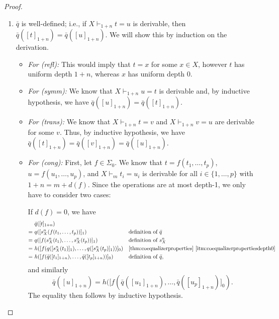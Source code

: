 \documentclass[11pt,a4paper]{amsart}
\newcommand{\sigp}{\Sigma_0}
\newcommand{\supp}{\mathsf{supp}}
\theoremstyle{plain}
\numberwithin{equation}{section}
\newcommand{\+}[1]{\mathcal{#1}\xspace}
\theoremstyle{definition}
\begin{document}
\begin{proof}
\begin{enumerate}[wide]
            Furthermore, it follows by equivariance of \(s^n_X\), the canonical projection, and \(q\), that
            \[
                \supp(\bar{q}([t]_{1 + n})) = \supp(q([s^n_X(t)]_1)) \subseteq \supp(t).
            \]
        \item \label{itm:coequalizerwelldefinedness}
            \(\bar{q}\) is well-defined; i.e., if \(X \vdash_{1 + n} t = u\) is derivable, then \(\bar{q}([t]_{1 + n}) = \bar{q}([u]_{1 + n})\).
            We will show this by induction on the derivation.
            \begin{itemize}
                \item
                    \textit{For (refl):}
                    This would imply that \(t = x\) for some \(x \in X\), however \(t\) has uniform depth \(1 + n\), whereas \(x\) has uniform depth \(0\).
                \item
                    \textit{For (symm):}
                    We know that \(X \vdash_{1 + n} u = t\) is derivable and, by inductive hypothesis, we have \(\bar{q}([u]_{1 + n}) = \bar{q}([t]_{1 + n})\).
                \item
                    \textit{For (trans):}
                    We know that \(X \vdash_{1 + n} t = v\) and \(X \vdash_{1 + n} v = u\) are derivable for some \(v\).
                    Thus, by inductive hypothesis, we have \(\bar{q}([t]_{1 + n}) = \bar{q}([v]_{1 + n}) = \bar{q}([u]_{1 + n})\).
                \item
                    \textit{For (cong):} First, let $f\in\sigp$.
                    We know that \(t = f(t_1, \ldots, t_p)\), \(u = f(u_1, \ldots, u_p)\), and \(X \vdash_m t_i = u_i\) is derivable for all \(i \in \{1, \ldots, p\}\) with \(1 + n = m + d(f)\).
                    Since the operations are at most depth-1, we only have to consider two cases:

                    If \(d(f) = 0\), we have
                    \begin{align*}
                        &\bar{q}([t]_{1 + n}) \\
                        =~&q([s^n_X(f(t_1, \ldots, t_p))]_1) && \text{definition of } \bar{q} \\
                        =~&q([f(s^n_X(t_1), \ldots, s^n_X(t_p))]_1) && \text{definition of } s^n_X \\
                        =~&h([f(q([s^n_X(t_1)]_1), \ldots, q([s^n_X(t_p)]_1))]_0) && \text{\cref{thm:coequalizerproperties} \eqref{itm:coequalizerpropertiesdepth0}} \\
                        =~&h([f(\bar{q}([t_1]_{1 + n}), \ldots, \bar{q}([t_p]_{1 + n}))]_0) && \text{definition of } \bar{q},
                    \end{align*}
                    and similarly
                    \[
                        \bar{q}([u]_{1 + n}) = h([f(\bar{q}([u_1]_{1 + n}), \ldots, \bar{q}([u_p]_{1 + n})]_0).
                    \]
                    The equality then follows by inductive hypothesis.


\end{itemize}
\end{enumerate}
\end{proof}
\end{document}

